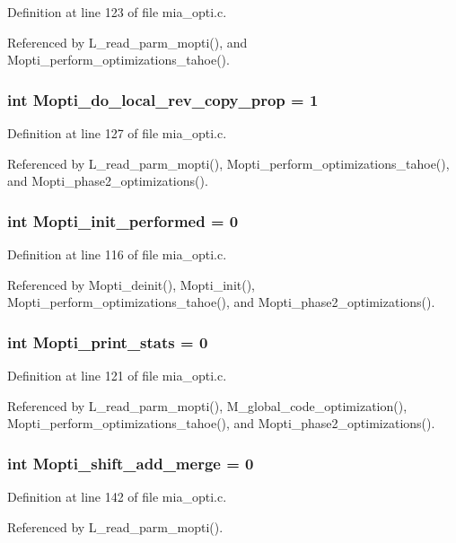 Definition at line 123 of file mia\_\-opti.c.

Referenced by L\_\-read\_\-parm\_\-mopti(), and Mopti\_\-perform\_\-optimizations\_\-tahoe().
\subsubsection{\setlength{\rightskip}{0pt plus 5cm}int \bf{Mopti\_\-do\_\-local\_\-rev\_\-copy\_\-prop} = 1\hspace{0.3cm}{\tt  [static]}}\label{mia__opti_8c_b12d2173535cfb38b1e6331b4dece929}




Definition at line 127 of file mia\_\-opti.c.

Referenced by L\_\-read\_\-parm\_\-mopti(), Mopti\_\-perform\_\-optimizations\_\-tahoe(), and Mopti\_\-phase2\_\-optimizations().
\subsubsection{\setlength{\rightskip}{0pt plus 5cm}int \bf{Mopti\_\-init\_\-performed} = 0\hspace{0.3cm}{\tt  [static]}}\label{mia__opti_8c_381daf2a188a9e511257baf6324a6c41}




Definition at line 116 of file mia\_\-opti.c.

Referenced by Mopti\_\-deinit(), Mopti\_\-init(), Mopti\_\-perform\_\-optimizations\_\-tahoe(), and Mopti\_\-phase2\_\-optimizations().
\subsubsection{\setlength{\rightskip}{0pt plus 5cm}int \bf{Mopti\_\-print\_\-stats} = 0}\label{mia__opti_8c_8b2b3e7d98bd625d28e844932802ef08}




Definition at line 121 of file mia\_\-opti.c.

Referenced by L\_\-read\_\-parm\_\-mopti(), M\_\-global\_\-code\_\-optimization(), Mopti\_\-perform\_\-optimizations\_\-tahoe(), and Mopti\_\-phase2\_\-optimizations().
\subsubsection{\setlength{\rightskip}{0pt plus 5cm}int \bf{Mopti\_\-shift\_\-add\_\-merge} = 0}\label{mia__opti_8c_3b37cc605784201bd63a25c531aa19c7}




Definition at line 142 of file mia\_\-opti.c.

Referenced by L\_\-read\_\-parm\_\-mopti().